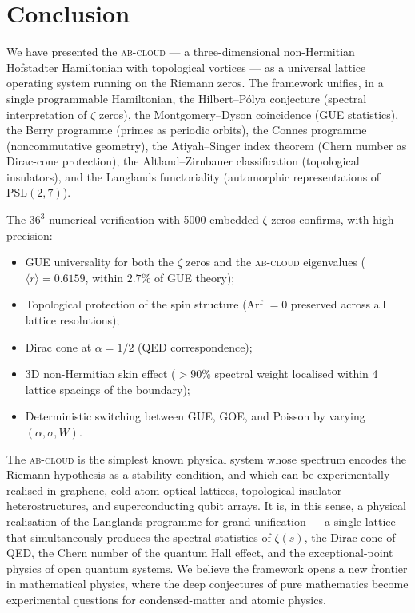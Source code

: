 \documentclass[11pt,a4paper]{article}
\theoremstyle{plain}
\theoremstyle{definition}
\theoremstyle{remark}
\newcommand{\rh}{\langle r\rangle}
\newcommand{\Abcloud}{\textsc{ab-cloud}}
\begin{document}
\section{Conclusion}

We have presented the \Abcloud{} — a three-dimensional non-Hermitian Hofstadter Hamiltonian with topological vortices — as a universal lattice operating system running on the Riemann zeros. The framework unifies, in a single programmable Hamiltonian, the Hilbert--Pólya conjecture (spectral interpretation of $\zeta$ zeros), the Montgomery--Dyson coincidence (GUE statistics), the Berry programme (primes as periodic orbits), the Connes programme (noncommutative geometry), the Atiyah--Singer index theorem (Chern number as Dirac-cone protection), the Altland--Zirnbauer classification (topological insulators), and the Langlands functoriality (automorphic representations of $\mathrm{PSL}(2,7)$).

The $36^3$ numerical verification with 5000 embedded $\zeta$ zeros confirms, with high precision:
\begin{itemize}[leftmargin=*,itemsep=1pt]
    \item GUE universality for both the $\zeta$ zeros and the \Abcloud{} eigenvalues ($\rh = 0.6159$, within $2.7\%$ of GUE theory);
    \item Topological protection of the spin structure (Arf $= 0$ preserved across all lattice resolutions);
    \item Dirac cone at $\alpha = 1/2$ (QED correspondence);
    \item 3D non-Hermitian skin effect ($>90\%$ spectral weight localised within 4 lattice spacings of the boundary);
    \item Deterministic switching between GUE, GOE, and Poisson by varying $(\alpha, \sigma, W)$.
\end{itemize}

The \Abcloud{} is the simplest known physical system whose spectrum encodes the Riemann hypothesis as a stability condition, and which can be experimentally realised in graphene, cold-atom optical lattices, topological-insulator heterostructures, and superconducting qubit arrays. It is, in this sense, a physical realisation of the Langlands programme for grand unification — a single lattice that simultaneously produces the spectral statistics of $\zeta(s)$, the Dirac cone of QED, the Chern number of the quantum Hall effect, and the exceptional-point physics of open quantum systems. We believe the framework opens a new frontier in mathematical physics, where the deep conjectures of pure mathematics become experimental questions for condensed-matter and atomic physics.
\end{document}
